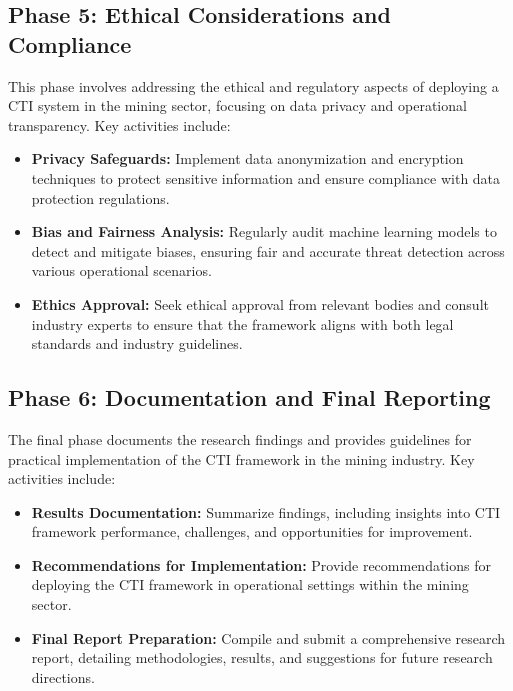 \documentclass[a4paper,twoside,12pt]{report}
\begin{document}
\subsection{Phase 5: Ethical Considerations and Compliance}  
This phase involves addressing the ethical and regulatory aspects of deploying a CTI system in the mining sector, focusing on data privacy and operational transparency. Key activities include:
\begin{itemize}
    \item \textbf{Privacy Safeguards:} Implement data anonymization and encryption techniques to protect sensitive information and ensure compliance with data protection regulations.
    \item \textbf{Bias and Fairness Analysis:} Regularly audit machine learning models to detect and mitigate biases, ensuring fair and accurate threat detection across various operational scenarios.
    \item \textbf{Ethics Approval:} Seek ethical approval from relevant bodies and consult industry experts to ensure that the framework aligns with both legal standards and industry guidelines.
\end{itemize}

\subsection{Phase 6: Documentation and Final Reporting}  
The final phase documents the research findings and provides guidelines for practical implementation of the CTI framework in the mining industry. Key activities include:
\begin{itemize}
    \item \textbf{Results Documentation:} Summarize findings, including insights into CTI framework performance, challenges, and opportunities for improvement.
    \item \textbf{Recommendations for Implementation:} Provide recommendations for deploying the CTI framework in operational settings within the mining sector.
    \item \textbf{Final Report Preparation:} Compile and submit a comprehensive research report, detailing methodologies, results, and suggestions for future research directions.
\end{itemize}
\end{document}
